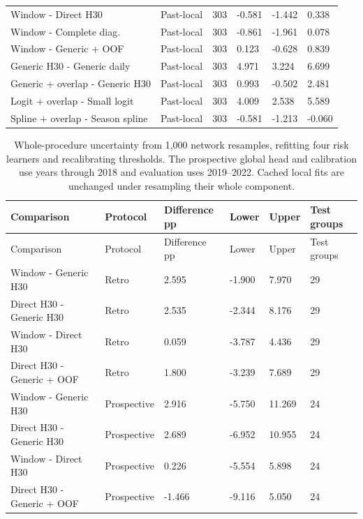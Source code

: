 {\begin{longtable}{p{}p{}p{}p{}p{}p{}}
Window - Direct H30 & Past-local & 303 & -0.581 & -1.442 & 0.338 \\
Window - Complete diag. & Past-local & 303 & -0.861 & -1.961 & 0.078 \\
Window - Generic + OOF & Past-local & 303 & 0.123 & -0.628 & 0.839 \\
Generic H30 - Generic daily & Past-local & 303 & 4.971 & 3.224 & 6.699 \\
Generic + overlap - Generic H30 & Past-local & 303 & 0.993 & -0.502 & 2.481 \\
Logit + overlap - Small logit & Past-local & 303 & 4.009 & 2.538 & 5.589 \\
Spline + overlap - Season spline & Past-local & 303 & -0.581 & -1.213 & -0.060 \\
\bottomrule
\end{longtable}
}

{\tabletext
\setlength{\tabcolsep}{3pt}
\begin{longtable}{p{}p{}p{}p{}p{}p{}}
\caption{Whole-procedure uncertainty from 1,000 network resamples, refitting four risk learners and recalibrating thresholds. The prospective global head and calibration use years through 2018 and evaluation uses 2019--2022. Cached local fits are unchanged under resampling their whole component.}\label{tab:r3si-whole_procedure}\\
\toprule
Comparison & Protocol & Difference pp & Lower & Upper & Test groups \\
\midrule
\endfirsthead
\toprule
Comparison & Protocol & Difference pp & Lower & Upper & Test groups \\
\midrule
\endhead
Window - Generic H30 & Retro & 2.595 & -1.900 & 7.970 & 29 \\
Direct H30 - Generic H30 & Retro & 2.535 & -2.344 & 8.176 & 29 \\
Window - Direct H30 & Retro & 0.059 & -3.787 & 4.436 & 29 \\
Direct H30 - Generic + OOF & Retro & 1.800 & -3.239 & 7.689 & 29 \\
Window - Generic H30 & Prospective & 2.916 & -5.750 & 11.269 & 24 \\
Direct H30 - Generic H30 & Prospective & 2.689 & -6.952 & 10.955 & 24 \\
Window - Direct H30 & Prospective & 0.226 & -5.554 & 5.898 & 24 \\
Direct H30 - Generic + OOF & Prospective & -1.466 & -9.116 & 5.050 & 24 \\
\bottomrule
\end{longtable}
}


